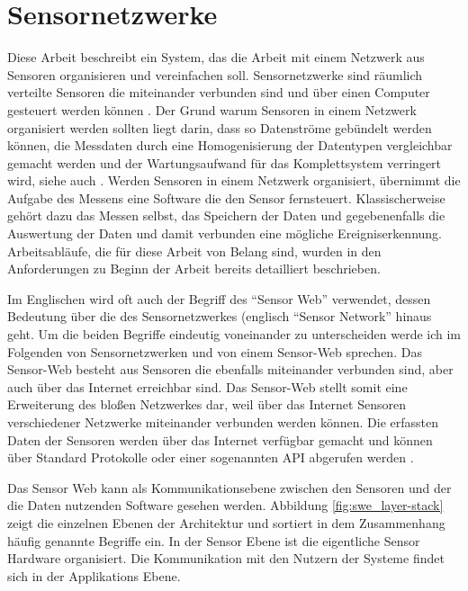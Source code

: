 \section{Sensornetzwerke}
Diese Arbeit beschreibt ein System, das die Arbeit mit einem Netzwerk aus Sensoren organisieren und vereinfachen soll. Sensornetzwerke sind räumlich verteilte Sensoren die miteinander verbunden sind und über einen Computer gesteuert werden können \citep{botts_ogc_2008}. Der Grund warum Sensoren in einem Netzwerk organisiert werden sollten liegt darin, dass so Datenströme gebündelt werden können, die Messdaten durch eine Homogenisierung der Datentypen vergleichbar gemacht werden und der Wartungsaufwand für das Komplettsystem verringert wird, siehe auch \citep{resch_standardisierte_2012} \citep{bermudez_ogc_2011}. Werden Sensoren in einem Netzwerk organisiert, übernimmt die Aufgabe des Messens eine Software die den Sensor fernsteuert. Klassischerweise gehört dazu das Messen selbst, das Speichern der Daten und gegebenenfalls die Auswertung der Daten und damit verbunden eine mögliche Ereigniserkennung. Arbeitsabläufe, die für diese Arbeit von Belang sind, wurden in den Anforderungen zu Beginn der Arbeit bereits detailliert beschrieben. 

Im Englischen wird oft auch der Begriff des ``Sensor Web'' verwendet, dessen Bedeutung über die des Sensornetzwerkes (englisch ``Sensor Network'' hinaus geht. Um die beiden Begriffe eindeutig voneinander zu unterscheiden werde ich im Folgenden von Sensornetzwerken und von einem Sensor-Web sprechen. Das Sensor-Web besteht aus Sensoren die ebenfalls miteinander verbunden sind, aber auch über das Internet erreichbar sind. Das Sensor-Web stellt somit eine Erweiterung des bloßen Netzwerkes dar, weil über das Internet Sensoren verschiedener Netzwerke miteinander verbunden werden können. Die erfassten Daten der Sensoren werden über das Internet verfügbar gemacht und können über Standard Protokolle oder einer sogenannten  \gls{API} abgerufen werden \citep{broring_new_2011}\citep{botts_ogc_2008}\citep{guinard_towards_2009}.

Das Sensor Web kann als Kommunikationsebene zwischen den Sensoren und der die Daten nutzenden Software gesehen werden. Abbildung \ref{fig:swe_layer-stack} zeigt die einzelnen Ebenen der Architektur und sortiert in dem Zusammenhang häufig genannte Begriffe ein. In der Sensor Ebene ist die eigentliche Sensor Hardware organisiert. Die Kommunikation mit den Nutzern der Systeme findet sich in der Applikations Ebene.

